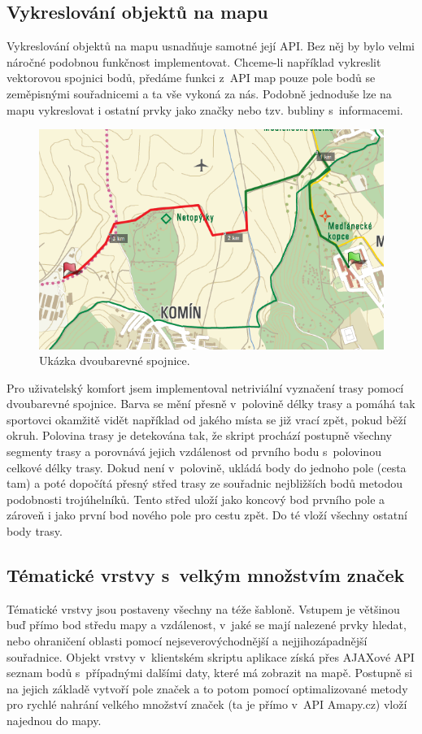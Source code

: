 \subsection{Vykreslování objektů na mapu}\label{kresleni}
Vykreslování objektů na mapu usnadňuje samotné její API. Bez něj
by bylo velmi náročné podobnou funkčnost implementovat. Chceme-li
například vykreslit vektorovou spojnici bodů, předáme funkci z~API
map pouze pole bodů se zeměpisnými souřadnicemi a ta vše vykoná za
nás. Podobně jednoduše lze na mapu vykreslovat i ostatní prvky jako
značky nebo tzv. bubliny s~informacemi.

\begin{figure}[h]
	\includegraphics[width=\textwidth, keepaspectratio]{fig/screenline}
	\caption{Ukázka dvoubarevné spojnice.}
	\label{obrLine}
\end{figure}

Pro uživatelský komfort jsem implementoval netriviální vyznačení
trasy pomocí dvoubarevné spojnice. Barva se mění přesně v~polovině
délky trasy a pomáhá tak sportovci okamžitě vidět například od jakého
místa se již vrací zpět, pokud běží okruh. Polovina trasy je
detekována tak, že skript prochází postupně všechny segmenty trasy a
porovnává jejich vzdálenost od prvního bodu s~polovinou celkové délky
trasy. Dokud není v~polovině, ukládá body do jednoho pole (cesta tam)
a poté dopočítá přesný střed trasy ze souřadnic nej\-bližších bodů metodou
podobnosti trojúhelníků. Tento střed uloží jako koncový bod prvního
pole a zároveň i jako první bod nového pole pro cestu zpět. Do té
vloží všechny ostatní body trasy.

\subsection{Tématické vrstvy s~velkým množstvím značek}\label{vrstvy}
Tématické vrstvy jsou postaveny všechny na téže šabloně. Vstupem je
většinou buď přímo bod středu mapy a vzdálenost, v~jaké se mají
nalezené prvky hledat, nebo ohraničení oblasti pomocí
nej\-severovýchodnější a nej\-jihozápadnější souřadnice. Objekt vrstvy
v~klientském skriptu aplikace získá přes AJAXové API seznam bodů
s~případnými dalšími daty, které má zobrazit na mapě. Postupně si na
jejich základě vytvoří pole značek a to potom pomocí optimalizované
metody pro rychlé nahrání velkého množství značek (ta je přímo v~API
Amapy.cz) vloží najednou do mapy.


